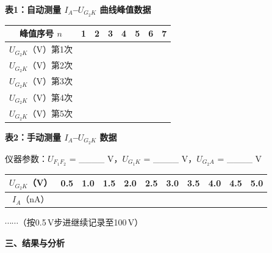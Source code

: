 \documentclass[a4paper,12pt]{article}
\begin{document}
\vspace{0.5cm}

{\fontsize{12pt}{18pt}\selectfont \textbf{表1：自动测量 $I_A$--$U_{G_2K}$ 曲线峰值数据}}

\vspace{0.3cm}

{\fontsize{10.5pt}{15pt}\selectfont
\begin{tabular}{c|ccccccc}
    \toprule
    峰值序号 $n$ & 1 & 2 & 3 & 4 & 5 & 6 & 7 \\
    \midrule
    $U_{G_2K}$（V）第1次 & & & & & & & \\[0.3em]
    $U_{G_2K}$（V）第2次 & & & & & & & \\[0.3em]
    $U_{G_2K}$（V）第3次 & & & & & & & \\[0.3em]
    $U_{G_2K}$（V）第4次 & & & & & & & \\[0.3em]
    $U_{G_2K}$（V）第5次 & & & & & & & \\[0.3em]
    \bottomrule
\end{tabular}
}

\vspace{0.8cm}

{\fontsize{12pt}{18pt}\selectfont \textbf{表2：手动测量 $I_A$--$U_{G_2K}$ 数据}}

\vspace{0.3cm}

{\fontsize{10pt}{14pt}\selectfont
仪器参数：$U_{F_1F_2}$ = \_\_\_\_ V，$U_{G_1K}$ = \_\_\_\_ V，$U_{G_2A}$ = \_\_\_\_ V

\vspace{0.2cm}

\begin{tabular}{c|w{r}{0.72cm} w{r}{0.72cm} w{r}{0.72cm} w{r}{0.72cm} w{r}{0.72cm} w{r}{0.72cm} w{r}{0.72cm} w{r}{0.72cm} w{r}{0.72cm} w{r}{0.72cm}}
    \toprule
    $U_{G_2K}$（V） & 0.5 & 1.0 & 1.5 & 2.0 & 2.5 & 3.0 & 3.5 & 4.0 & 4.5 & 5.0 \\
    \midrule
    $I_A$（nA） & & & & & & & & & & \\
    \bottomrule
\end{tabular}

\vspace{0.1cm}
\begin{center}
    $\cdots\cdots$（按0.5\,V步进继续记录至100\,V）
\end{center}
}

\newpage

{\fontsize{16pt}{24pt}\selectfont \textbf{三、结果与分析}}
\end{document}
